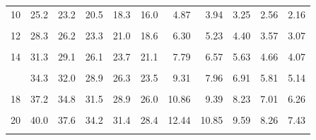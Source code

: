 \documentclass[11pt,ignorenonframetext,aspectratio=169]{beamer}
\begin{document}
\begin{frame}{}
\begin{table}
\begin{tabular}[t]{lrrrr|>{}rrrrrr}
10 & 25.2 & 23.2 & 20.5 & 18.3 & 16.0 & 4.87 & 3.94 & 3.25 & 2.56 & 2.16\\
\addlinespace
\cellcolor{gray!6}{11} & \cellcolor{gray!6}{26.8} & \cellcolor{gray!6}{24.7} & \cellcolor{gray!6}{21.9} & \cellcolor{gray!6}{19.7} & \cellcolor{gray!6}{17.3} & \cellcolor{gray!6}{5.58} & \cellcolor{gray!6}{4.57} & \cellcolor{gray!6}{3.82} & \cellcolor{gray!6}{3.05} & \cellcolor{gray!6}{2.60}\\
12 & 28.3 & 26.2 & 23.3 & 21.0 & 18.6 & 6.30 & 5.23 & 4.40 & 3.57 & 3.07\\
\cellcolor{gray!6}{13} & \cellcolor{gray!6}{29.8} & \cellcolor{gray!6}{27.7} & \cellcolor{gray!6}{24.7} & \cellcolor{gray!6}{22.4} & \cellcolor{gray!6}{19.8} & \cellcolor{gray!6}{7.04} & \cellcolor{gray!6}{5.89} & \cellcolor{gray!6}{5.01} & \cellcolor{gray!6}{4.11} & \cellcolor{gray!6}{3.57}\\
14 & 31.3 & 29.1 & 26.1 & 23.7 & 21.1 & 7.79 & 6.57 & 5.63 & 4.66 & 4.07\\
\cellcolor{gray!6}{15} & \cellcolor{gray!6}{32.8} & \cellcolor{gray!6}{30.6} & \cellcolor{gray!6}{27.5} & \cellcolor{gray!6}{25.0} & \cellcolor{gray!6}{22.3} & \cellcolor{gray!6}{8.55} & \cellcolor{gray!6}{7.26} & \cellcolor{gray!6}{6.26} & \cellcolor{gray!6}{5.23} & \cellcolor{gray!6}{4.60}\\
\addlinespace
16 & 34.3 & 32.0 & 28.9 & 26.3 & 23.5 & 9.31 & 7.96 & 6.91 & 5.81 & 5.14\\
\cellcolor{gray!6}{17} & \cellcolor{gray!6}{35.7} & \cellcolor{gray!6}{33.4} & \cellcolor{gray!6}{30.2} & \cellcolor{gray!6}{27.6} & \cellcolor{gray!6}{24.8} & \cellcolor{gray!6}{10.09} & \cellcolor{gray!6}{8.67} & \cellcolor{gray!6}{7.56} & \cellcolor{gray!6}{6.41} & \cellcolor{gray!6}{5.70}\\
18 & 37.2 & 34.8 & 31.5 & 28.9 & 26.0 & 10.86 & 9.39 & 8.23 & 7.01 & 6.26\\
\cellcolor{gray!6}{19} & \cellcolor{gray!6}{38.6} & \cellcolor{gray!6}{36.2} & \cellcolor{gray!6}{32.9} & \cellcolor{gray!6}{30.1} & \cellcolor{gray!6}{27.2} & \cellcolor{gray!6}{11.65} & \cellcolor{gray!6}{10.12} & \cellcolor{gray!6}{8.91} & \cellcolor{gray!6}{7.63} & \cellcolor{gray!6}{6.84}\\
20 & 40.0 & 37.6 & 34.2 & 31.4 & 28.4 & 12.44 & 10.85 & 9.59 & 8.26 & 7.43\\
\addlinespace
\cellcolor{gray!6}{25} & \cellcolor{gray!6}{46.9} & \cellcolor{gray!6}{44.3} & \cellcolor{gray!6}{40.6} & \cellcolor{gray!6}{37.6} & \cellcolor{gray!6}{34.4} & \cellcolor{gray!6}{16.47} & \cellcolor{gray!6}{14.61} & \cellcolor{gray!6}{13.12} & \cellcolor{gray!6}{11.52} & \cellcolor{gray!6}{10.52}\\

\end{tabular}
\end{table}
\end{frame}
\end{document}
